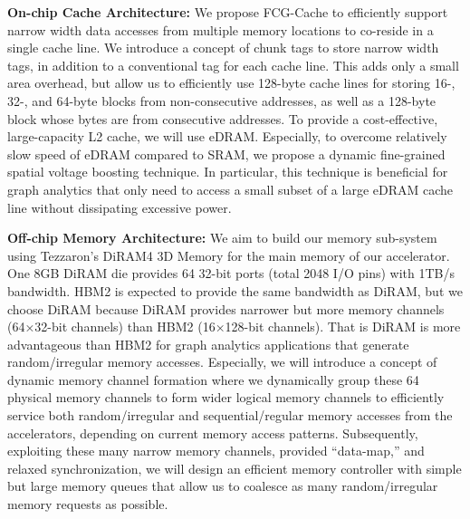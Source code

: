 \noindent
\textbf{On-chip Cache Architecture:} 
We propose FCG-Cache to efficiently support narrow width data accesses from multiple memory locations to co-reside in a single cache line. 
We introduce a concept of chunk tags to store narrow width tags, in addition to a conventional tag for each cache line. 
This adds only a small area overhead, but allow us to efficiently use 128-byte cache lines for storing 16-, 32-, and 64-byte blocks from non-consecutive addresses, as well as a 128-byte block whose bytes are from consecutive addresses. 
To provide a cost-effective, large-capacity L2 cache, we will use eDRAM. 
Especially, to overcome relatively slow speed of eDRAM compared to SRAM, we propose a dynamic fine-grained spatial voltage boosting technique. 
In particular, this technique is beneficial for graph analytics that only need to access a small subset of a large eDRAM cache line without dissipating excessive power.

\noindent
\textbf{Off-chip Memory Architecture:} 
We aim to build our memory sub-system using Tezzaron’s DiRAM4 3D Memory for the main memory of our accelerator. 
One 8GB DiRAM die provides 64 32-bit ports (total 2048 I/O pins) with 1TB/s bandwidth. 
HBM2 is expected to provide the same bandwidth as DiRAM, but we choose DiRAM because DiRAM provides narrower but more memory channels (64×32-bit channels) than HBM2 (16×128-bit channels). 
That is DiRAM is more advantageous than HBM2 for graph analytics applications that generate random/irregular memory accesses. 
Especially, we will introduce a concept of dynamic memory channel formation where we dynamically group these 64 physical memory channels to form wider logical memory channels to efficiently service both random/irregular and sequential/regular memory accesses from the accelerators, depending on current memory access patterns. 
Subsequently, exploiting these many narrow memory channels, provided ``data-map,'' and relaxed synchronization, we will design an efficient memory controller with simple but large memory queues that allow us to coalesce as many random/irregular memory requests as possible.
